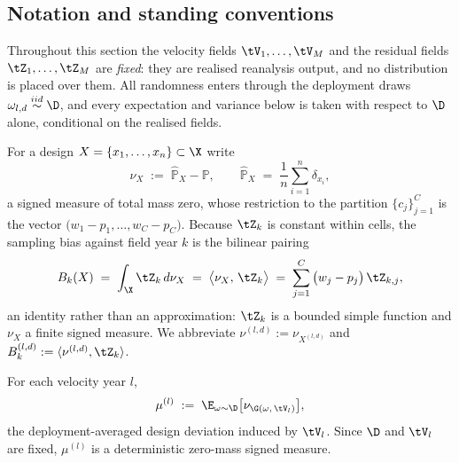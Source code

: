 %

\subsection{Notation and standing conventions}
\label{sec:align-setup}

Throughout this section the velocity fields $\tV_1,\dots,\tV_M$ and the residual fields
$\tZ_1,\dots,\tZ_M$ are \emph{fixed}: they are realised reanalysis output, and no distribution is
placed over them. All randomness enters through the deployment draws
$\omega_{l,d} \overset{iid}{\sim} \D$, and every expectation and variance below is taken with
respect to $\D$ alone, conditional on the realised fields.

For a design $X = \{x_1,\dots,x_n\} \subset \X$ write
\begin{equation}
  \label{eq:mu-def}
  \nu_X \;:=\; \hat{\mathbb{P}}_X - \mathbb{P},
  \qquad
  \hat{\mathbb{P}}_X \;=\; \frac1n \sum_{i=1}^{n}\delta_{x_i},
\end{equation}
a signed measure of total mass zero, whose restriction to the partition $\{c_j\}_{j=1}^{C}$ is the
vector $\big(w_1 - p_1, \dots, w_C - p_C\big)$. Because $\tZ_k$ is constant within cells, the
sampling bias against field year $k$ is the bilinear pairing
\begin{equation}
  \label{eq:pairing}
  B_k(X) \;=\; \int_{\X} \tZ_k \, d\nu_X
  \;=\; \big\langle \nu_X,\, \tZ_k \big\rangle
  \;=\; \sum_{j=1}^{C}\big(w_j - p_j\big)\,\tZ_{k,j},
\end{equation}
an identity rather than an approximation: $\tZ_k$ is a bounded simple function and $\nu_X$ a finite
signed measure. We abbreviate $\nu^{(l,d)} := \nu_{X^{(l,d)}}$ and
$B_k^{(l,d)} := \langle \nu^{(l,d)}, \tZ_k\rangle$.

\begin{definition}
\label{def:footprint}
For each velocity year $l$,
\begin{equation}
  \mu^{(l)} \;:=\; \E_{\omega \sim \D}\big[\nu_{\G(\omega,\, \tV_l)}\big],
\end{equation}
the deployment-averaged design deviation induced by $\tV_l$. Since $\D$ and $\tV_l$ are fixed,
$\mu^{(l)}$ is a deterministic zero-mass signed measure.
\end{definition}

